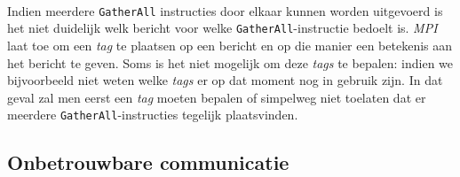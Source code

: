 \paragraph{}
Indien meerdere \texttt{GatherAll} instructies door elkaar kunnen worden uitgevoerd is het niet duidelijk welk bericht voor welke \texttt{GatherAll}-instructie bedoelt is. \emph{MPI} laat toe om een \emph{tag} te plaatsen op een bericht en op die manier een betekenis aan het bericht te geven. Soms is het niet mogelijk om deze \emph{tags} te bepalen: indien we bijvoorbeeld niet weten welke \emph{tags} er op dat moment nog in gebruik zijn. In dat geval zal men eerst een \emph{tag} moeten bepalen of simpelweg niet toelaten dat er meerdere \texttt{GatherAll}-instructies tegelijk plaatsvinden.


\subsection{Onbetrouwbare communicatie}




